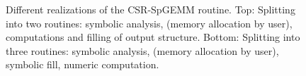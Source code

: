 \begin{figure}
{%
    }
    \caption{Different realizations of the CSR-SpGEMM routine. Top: Splitting into two routines: symbolic analysis, (memory allocation by user), computations and filling of output structure. Bottom: Splitting into three routines: symbolic analysis, (memory allocation by user), symbolic fill, numeric computation.}
    \label{fig:SpGEMM_workflows}
\end{figure}

